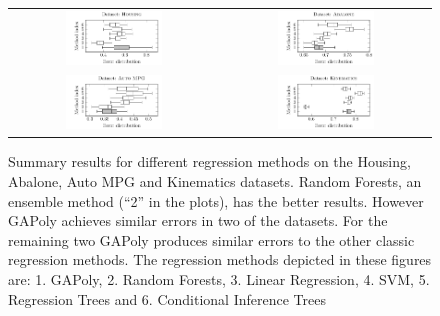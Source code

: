 \documentclass[preprint,authoryear,12pt]{elsarticle}
\begin{document}
\begin{figure}[tb]\begin{center}
\begin{tabular}{cc}
\includegraphics[width=0.48\textwidth]{figure_3a.pdf}
%
&
%
\includegraphics[width=0.48\textwidth]{figure_3b.pdf}
%
\\
%
\includegraphics[width=0.48\textwidth]{figure_3c.pdf}
%
&
%
\includegraphics[width=0.48\textwidth]{figure_3d.pdf}
%
\end{tabular}

\caption{Summary results for different regression methods on the Housing, Abalone, Auto MPG and Kinematics datasets. Random Forests, an ensemble method (``2'' in the plots), has the better results. However \ac{GAPoly} achieves similar errors in two of the datasets. For the remaining two \ac{GAPoly} produces similar errors to the other classic regression methods.  The regression methods depicted in these figures are: 1. \ac{GAPoly}, 2. Random Forests, 3. Linear Regression, 4. SVM, 5. Regression Trees and 6. Conditional Inference Trees}
\label{Housing_dataset_lambda0.8_25runs}
\label{Abalone_dataset_lambda0.8_25runs}
\label{Auto-Mpg_dataset_lambda0.8_25runs}
\label{Kinematics300_lambda0.8_25runs}
\end{center}\end{figure}
\end{document}
